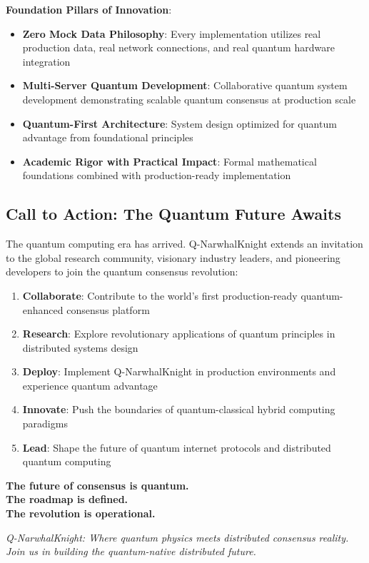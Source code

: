 \documentclass[11pt,a4paper]{article}
\begin{document}
\textbf{Foundation Pillars of Innovation}:
\begin{itemize}
\item \textbf{Zero Mock Data Philosophy}: Every implementation utilizes real production data, real network connections, and real quantum hardware integration
\item \textbf{Multi-Server Quantum Development}: Collaborative quantum system development demonstrating scalable quantum consensus at production scale
\item \textbf{Quantum-First Architecture}: System design optimized for quantum advantage from foundational principles
\item \textbf{Academic Rigor with Practical Impact}: Formal mathematical foundations combined with production-ready implementation
\end{itemize}

\subsection{Call to Action: The Quantum Future Awaits}

The quantum computing era has arrived. Q-NarwhalKnight extends an invitation to the global research community, visionary industry leaders, and pioneering developers to join the quantum consensus revolution:

\begin{enumerate}
\item \textbf{Collaborate}: Contribute to the world's first production-ready quantum-enhanced consensus platform
\item \textbf{Research}: Explore revolutionary applications of quantum principles in distributed systems design
\item \textbf{Deploy}: Implement Q-NarwhalKnight in production environments and experience quantum advantage
\item \textbf{Innovate}: Push the boundaries of quantum-classical hybrid computing paradigms
\item \textbf{Lead}: Shape the future of quantum internet protocols and distributed quantum computing
\end{enumerate}

\vspace{1cm}
\begin{tcolorbox}[colback=quantumblue!10!white,colframe=quantumblue!75!black]
\centering
\Large\textbf{The future of consensus is quantum.}\\
\Large\textbf{The roadmap is defined.}\\
\Large\textbf{The revolution is operational.}

\vspace{0.5cm}
\textit{Q-NarwhalKnight: Where quantum physics meets distributed consensus reality.}\\
\textit{Join us in building the quantum-native distributed future.}
\end{tcolorbox}
\end{document}
